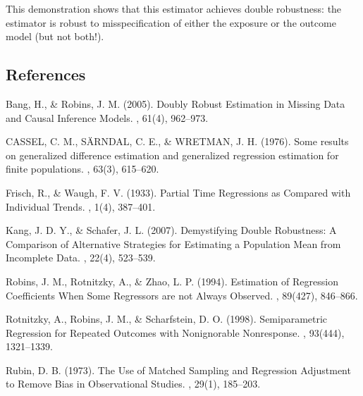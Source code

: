 \documentclass[letterpaper,10pt,english]{jupyterBook}
\begin{document}
\sphinxAtStartPar
This demonstration shows that this estimator achieves double robustness: the estimator is robust to misspecification of either the exposure or the outcome model (but not both!).


\subsection{References}
\label{\detokenize{Introduction and Conceptual Overview:references}}
\sphinxAtStartPar
Bang, H., \& Robins, J. M. (2005). Doubly Robust Estimation in Missing Data and Causal Inference Models. , 61(4), 962–973. 

\sphinxAtStartPar
CASSEL, C. M., SÄRNDAL, C. E., \& WRETMAN, J. H. (1976). Some results on generalized difference estimation and generalized regression estimation for finite populations. , 63(3), 615–620. 

\sphinxAtStartPar
Frisch, R., \& Waugh, F. V. (1933). Partial Time Regressions as Compared with Individual Trends. , 1(4), 387–401. 

\sphinxAtStartPar
Kang, J. D. Y., \& Schafer, J. L. (2007). Demystifying Double Robustness: A Comparison of Alternative Strategies for Estimating a Population Mean from Incomplete Data. , 22(4), 523–539. 

\sphinxAtStartPar
Robins, J. M., Rotnitzky, A., \& Zhao, L. P. (1994). Estimation of Regression Coefficients When Some Regressors are not Always Observed. , 89(427), 846–866. 

\sphinxAtStartPar
Rotnitzky, A., Robins, J. M., \& Scharfstein, D. O. (1998). Semiparametric Regression for Repeated Outcomes with Nonignorable Nonresponse. , 93(444), 1321–1339. 

\sphinxAtStartPar
Rubin, D. B. (1973). The Use of Matched Sampling and Regression Adjustment to Remove Bias in Observational Studies. , 29(1), 185–203. 
\end{document}
